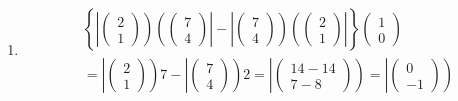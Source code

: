 \documentclass[aps,preprint]{revtex4}
\begin{document}
\begin{enumerate}
\item 
\begin{align}
& \left\{ \left\vert \left( 
\begin{array}{c}
2 \\ 
1%
\end{array}%
\right) \right) \left( \left( 
\begin{array}{c}
7 \\ 
4%
\end{array}%
\right) \right\vert -\left\vert \left( 
\begin{array}{c}
7 \\ 
4%
\end{array}%
\right) \right) \left( \left( 
\begin{array}{c}
2 \\ 
1%
\end{array}%
\right) \right\vert \right\} \left( 
\begin{array}{c}
1 \\ 
0%
\end{array}%
\right) \\
& =\left\vert \left( 
\begin{array}{c}
2 \\ 
1%
\end{array}%
\right) \right) 7-\left\vert \left( 
\begin{array}{c}
7 \\ 
4%
\end{array}%
\right) \right) 2=\left\vert \left( 
\begin{array}{c}
14-14 \\ 
7-8%
\end{array}%
\right) \right) =\left\vert \left( 
\begin{array}{c}
0 \\ 
-1%
\end{array}%
\right) \right)
\end{align}


\end{enumerate}
\end{document}
